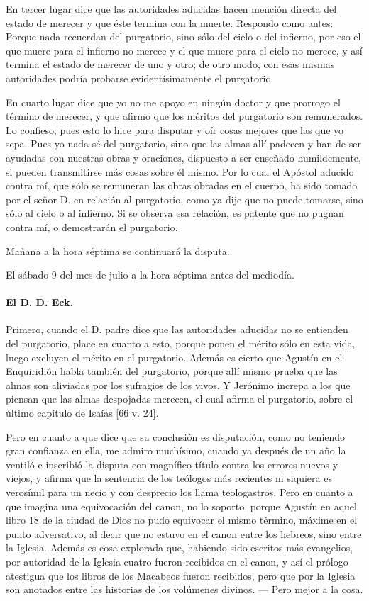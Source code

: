 En tercer lugar dice que las autoridades aducidas hacen mención directa del estado de merecer y que éste termina con la muerte. Respondo como antes: Porque nada recuerdan del purgatorio, sino sólo del cielo o del infierno, por eso el que muere para el infierno no merece y el que muere para el cielo no merece, y así termina el estado de merecer de uno y otro; de otro modo, con esas mismas autoridades podría probarse evidentísimamente el purgatorio.

En cuarto lugar dice que yo no me apoyo en ningún doctor y que prorrogo el término de merecer, y que afirmo que los méritos del purgatorio son remunerados. Lo confieso, pues esto lo hice para disputar y oír cosas mejores que las que yo sepa. Pues yo nada sé del purgatorio, sino que las almas allí padecen y han de ser ayudadas con nuestras obras y oraciones, dispuesto a ser enseñado humildemente, si pueden transmitirse más cosas sobre él mismo. Por lo cual el Apóstol aducido contra mí, que sólo se remuneran las obras obradas en el cuerpo, ha sido tomado por el señor D. en relación al purgatorio, como ya dije que no puede tomarse, sino sólo al cielo o al infierno. Si se observa esa relación, es patente que no pugnan contra mí, o demostrarán el purgatorio.

Mañana a la hora séptima se continuará la disputa.

El sábado 9 del mes de julio a la hora séptima antes del mediodía.

\paragraph*{El D. D. Eck.}

Primero, cuando el D. padre dice que las autoridades aducidas no se entienden del purgatorio, place en cuanto a esto, porque ponen el mérito sólo en esta vida, luego excluyen el mérito \marginpar{\small[326]} en el purgatorio. Además es cierto que Agustín en el Enquiridión habla también del purgatorio, porque allí mismo prueba que las almas son aliviadas por los sufragios de los vivos. Y Jerónimo increpa a los que piensan que las almas despojadas merecen, el cual afirma el purgatorio, sobre el último capítulo de Isaías [66 v. 24].

Pero en cuanto a que dice que su conclusión es disputación, como no teniendo gran confianza en ella, me admiro muchísimo, cuando ya después de un año la ventiló e inscribió la disputa con magnífico título contra los errores nuevos y viejos, y afirma que la sentencia de los teólogos más recientes ni siquiera es verosímil para un necio y con desprecio los llama teologastros. Pero en cuanto a que imagina una equivocación del canon, no lo soporto, porque Agustín en aquel libro 18 de la ciudad de Dios no pudo equivocar el mismo término, máxime en el punto adversativo, al decir que no estuvo en el canon entre los hebreos, sino entre la Iglesia. Además es cosa explorada que, habiendo sido escritos más evangelios, por autoridad de la Iglesia cuatro fueron recibidos en el canon, y así el prólogo atestigua que los libros de los Macabeos fueron recibidos, pero que por la Iglesia son anotados entre las historias de los volúmenes divinos. — Pero mejor a la cosa.

